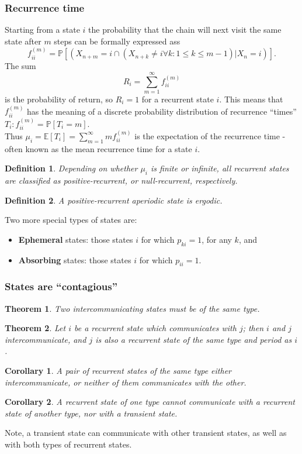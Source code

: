 \documentclass{article}
\newtheorem{theorem}{Theorem}
\newtheorem{corollary}{Corollary}
\newtheorem{definition}{Definition}
\newcommand{\Prob}{\mathbb{P}}
\newcommand{\E}{\mathbb{E}}
\begin{document}
\subsubsection{Recurrence time}
Starting from a state $i$ the probability that the chain will next visit the same state after $m$ steps can be formally expressed ass
\begin{equation}
    f_{ii}^{(m)} = \Prob[(X_{n+m}=i\cap(X_{n+k}\neq i\forall k:1\leq k\leq m-1)\vert X_n=i)].
\end{equation}
The sum
\begin{equation}
    R_i = \sum_{m=1}^\infty f_{ii}^{(m)}
\end{equation}
is the probability of return, so $R_i = 1$ for a recurrent state $i$. This means that $f_{ii}^{(m)}$ has the meaning of a discrete probability distribution of recurrence ``times'' $T_i:f_{ii}^{(m)} = \Prob[T_i = m]$.\\
Thus $\mu_i = \E[T_i] = \sum_{m=1}^\infty mf_{ii}^{(m)}$ is the expectation of the recurrence time - often known as the mean recurrence time for a state $i$.
\begin{definition}
    Depending on whether $\mu_i$ is finite or infinite, all recurrent states are classified as positive-recurrent, or null-recurrent, respectively.
\end{definition}
\begin{definition}
    A positive-recurrent aperiodic state is ergodic.
\end{definition}
Two more special types of states are:
\begin{itemize}
    \item \textbf{Ephemeral} states: those states $i$ for which $p_{ki}=1$, for any $k$, and
    \item \textbf{Absorbing} states: those states $i$ for which $p_{ii}=1$.
\end{itemize}

\subsubsection{States are ``contagious''}
\begin{theorem}
    Two intercommunicating states must be of the same type.
\end{theorem}
\begin{theorem}
    Let $i$ be a recurrent state which communicates with $j$; then $i$ and $j$ intercommunicate, and $j$ is also a recurrent state of the same type and period as $i$.
\end{theorem}
\begin{corollary}
    A pair of recurrent states of the same type either intercommunicate, or neither of them communicates with the other.
\end{corollary}
\begin{corollary}
    A recurrent state of one type cannot communicate with a recurrent state of another type, nor with a transient state.
\end{corollary}
Note, a transient state can communicate with other transient states, as well as with both types of recurrent states.
\end{document}
